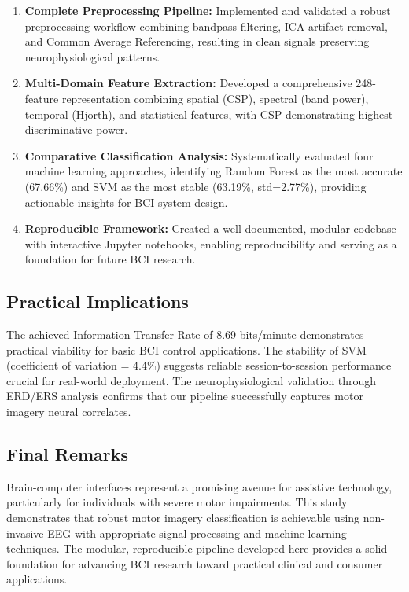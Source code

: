 \documentclass[11pt]{article}
\begin{document}
\begin{enumerate}
    \item \textbf{Complete Preprocessing Pipeline:} Implemented and validated a robust preprocessing workflow \citep{gramfort2013meg,delorme2004eeglab} combining bandpass filtering, ICA artifact removal, and Common Average Referencing, resulting in clean signals preserving neurophysiological patterns.

    \item \textbf{Multi-Domain Feature Extraction:} Developed a comprehensive 248-feature representation combining spatial (CSP), spectral (band power), temporal (Hjorth), and statistical features, with CSP demonstrating highest discriminative power.

    \item \textbf{Comparative Classification Analysis:} Systematically evaluated four machine learning approaches, identifying Random Forest as the most accurate (67.66\%) and SVM as the most stable (63.19\%, std=2.77\%), providing actionable insights for BCI system design.

    \item \textbf{Reproducible Framework:} Created a well-documented, modular codebase with interactive Jupyter notebooks, enabling reproducibility and serving as a foundation for future BCI research.
\end{enumerate}

\subsection{Practical Implications}

The achieved Information Transfer Rate of 8.69 bits/minute demonstrates practical viability for basic BCI control applications. The stability of SVM (coefficient of variation = 4.4\%) suggests reliable session-to-session performance crucial for real-world deployment. The neurophysiological validation through ERD/ERS analysis confirms that our pipeline successfully captures motor imagery neural correlates.

\subsection{Final Remarks}

Brain-computer interfaces represent a promising avenue for assistive technology, particularly for individuals with severe motor impairments. This study demonstrates that robust motor imagery classification is achievable using non-invasive EEG with appropriate signal processing and machine learning techniques. The modular, reproducible pipeline developed here provides a solid foundation for advancing BCI research toward practical clinical and consumer applications.
\end{document}
